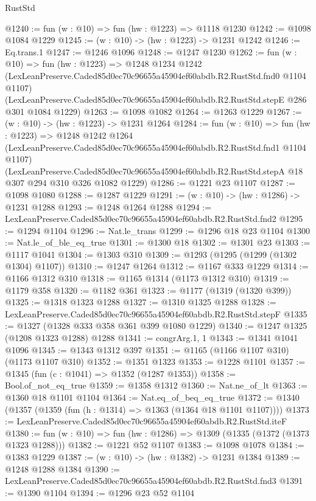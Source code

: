 \begin{lexlean}{RustStd}
\begin{coremodule}
@1240 := fun (w : @10) => fun (hw : @1223) => @1118 @1230
@1242 := @1098 @1084 @1229
@1245 := (w : @10) -> (hw : @1223) -> @1231 @1242
@1246 := Eq.trans.{1}
@1247 := @1246 @1096
@1248 := @1247 @1230
@1262 := fun (w : @10) =>
  fun (hw : @1223) =>
  @1248
    @1234
    @1242
    (LexLeanPreserve.Caded85d0ec70c96655a45904ef60abdb.R2.RustStd.fnd0 @1104 @1107)
    (LexLeanPreserve.Caded85d0ec70c96655a45904ef60abdb.R2.RustStd.stepE @286 @301 @1084 @1229)
@1263 := @1098 @1082
@1264 := @1263 @1229
@1267 := (w : @10) -> (hw : @1223) -> @1231 @1264
@1284 := fun (w : @10) =>
  fun (hw : @1223) =>
  @1248
    @1242
    @1264
    (LexLeanPreserve.Caded85d0ec70c96655a45904ef60abdb.R2.RustStd.fnd1 @1104 @1107)
    (LexLeanPreserve.Caded85d0ec70c96655a45904ef60abdb.R2.RustStd.stepA
      @18
      @307
      @294
      @310
      @326
      @1082
      @1229)
@1286 := @1221 @23 @1107
@1287 := @1098 @1080
@1288 := @1287 @1229
@1291 := (w : @10) -> (hw : @1286) -> @1231 @1288
@1293 := @1248 @1264 @1288
@1294 := LexLeanPreserve.Caded85d0ec70c96655a45904ef60abdb.R2.RustStd.fnd2
@1295 := @1294 @1104
@1296 := Nat.le_trans
@1299 := @1296 @18 @23 @1104
@1300 := Nat.le_of_ble_eq_true
@1301 := @1300 @18
@1302 := @1301 @23
@1303 := @1117 @1041
@1304 := @1303 @310
@1309 := @1293 (@1295 (@1299 (@1302 @1304) @1107))
@1310 := @1247 @1264
@1312 := @1167 @333 @1229
@1314 := @1166 @1312 @310
@1318 := @1165 @1314 (@1173 @1312 @310)
@1319 := @1179 @358
@1320 := @1182 @361
@1323 := @1177 (@1319 (@1320 @399))
@1325 := @1318 @1323 @1288
@1327 := @1310 @1325 @1288
@1328 := LexLeanPreserve.Caded85d0ec70c96655a45904ef60abdb.R2.RustStd.stepF
@1335 := @1327 (@1328 @333 @358 @361 @399 @1080 @1229)
@1340 := @1247 @1325 (@1208 @1323 @1288) @1288
@1341 := congrArg.{1, 1}
@1343 := @1341 @1041 @1096
@1345 := @1343 @1312 @397
@1351 := @1165 (@1166 @1107 @310) (@1173 @1107 @310)
@1352 := @1351 @1323
@1353 := @1228 @1101
@1357 := @1345 (fun (c : @1041) => @1352 (@1287 @1353))
@1358 := Bool.of_not_eq_true
@1359 := @1358 @1312
@1360 := Nat.ne_of_lt
@1363 := @1360 @18 @1101 @1104
@1364 := Nat.eq_of_beq_eq_true
@1372 := @1340 (@1357 (@1359 (fun (h : @1314) => @1363 (@1364 @18 @1101 @1107))))
@1373 := LexLeanPreserve.Caded85d0ec70c96655a45904ef60abdb.R2.RustStd.iteF
@1380 := fun (w : @10) => fun (hw : @1286) => @1309 (@1335 (@1372 (@1373 @1323 @1288)))
@1382 := @1221 @52 @1107
@1383 := @1098 @1078
@1384 := @1383 @1229
@1387 := (w : @10) -> (hw : @1382) -> @1231 @1384
@1389 := @1248 @1288 @1384
@1390 := LexLeanPreserve.Caded85d0ec70c96655a45904ef60abdb.R2.RustStd.fnd3
@1391 := @1390 @1104
@1394 := @1296 @23 @52 @1104

\end{coremodule}
\end{lexlean}
